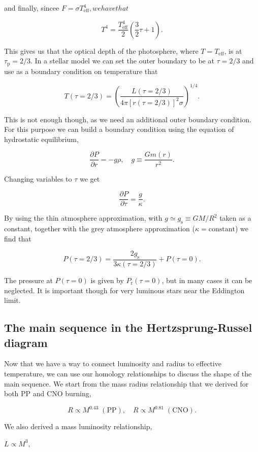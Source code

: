 \documentclass[twocolumn]{article}
\begin{document}
and finally, sincee \(F=\sigma T_\mathrm{eff}^4, we have that\)

\[T^4=\frac{T_\mathrm{eff}^4}{2}\left(\frac{3}{2}\tau+1\right).\]

This gives us that the optical depth of the photosphere, where
\(T=T_\mathrm{eff}\), is at \(\tau_\mathrm{p}=2/3\). In a stellar model
we can set the outer boundary to be at \(\tau=2/3\) and use as a
boundary condition on temperature that

\[T(\tau=2/3)=\left(\frac{L(\tau=2/3)}{4\pi [r(\tau=2/3)]^2\sigma}\right)^{1/4}.\]

This is not enough though, as we need an additional outer boundary
condition. For this purpose we can build a boundary condition using the
equation of hydrostatic equilibrium,

\[\frac{\partial P}{\partial r}=-g\rho,\quad g\equiv \frac{Gm(r)}{r^2}.\]

Changing variables to \(\tau\) we get

\[\frac{\partial P}{\partial \tau}=\frac{g}{\kappa}.\]

By using the thin atmosphere approximation, with
\(g\simeq g_\mathrm{s}\equiv GM/R^2\) taken as a constant, together with
the grey atmosphere approximation (\(\kappa=\mathrm{constant}\)) we find
that

\[P(\tau=2/3)=\frac{2g_\mathrm{s}}{3\kappa(\tau=2/3)}+P(\tau=0).\]

The pressure at \(P(\tau=0)\) is given by \(P_\mathrm{r}(\tau=0)\), but
in many cases it can be neglected. It is important though for very
luminous stars near the Eddington limit.

\hypertarget{the-main-sequence-in-the-hertzsprung-russel-diagram}{%
\subsection{The main sequence in the Hertzsprung-Russel
diagram}\label{the-main-sequence-in-the-hertzsprung-russel-diagram}}

Now that we have a way to connect luminosity and radius to effective
temperature, we can use our homology relationships to discuss the shape
of the main sequence. We start from the mass radius relationship that we
derived for both PP and CNO burning,

\[R\propto M^{0.43}\;\mathrm{(PP)},\quad R\propto M^{0.81}\;\mathrm{(CNO)}.\]

We also derived a mass luminosity relationship,

\(L\propto M^3,\)
\end{document}
